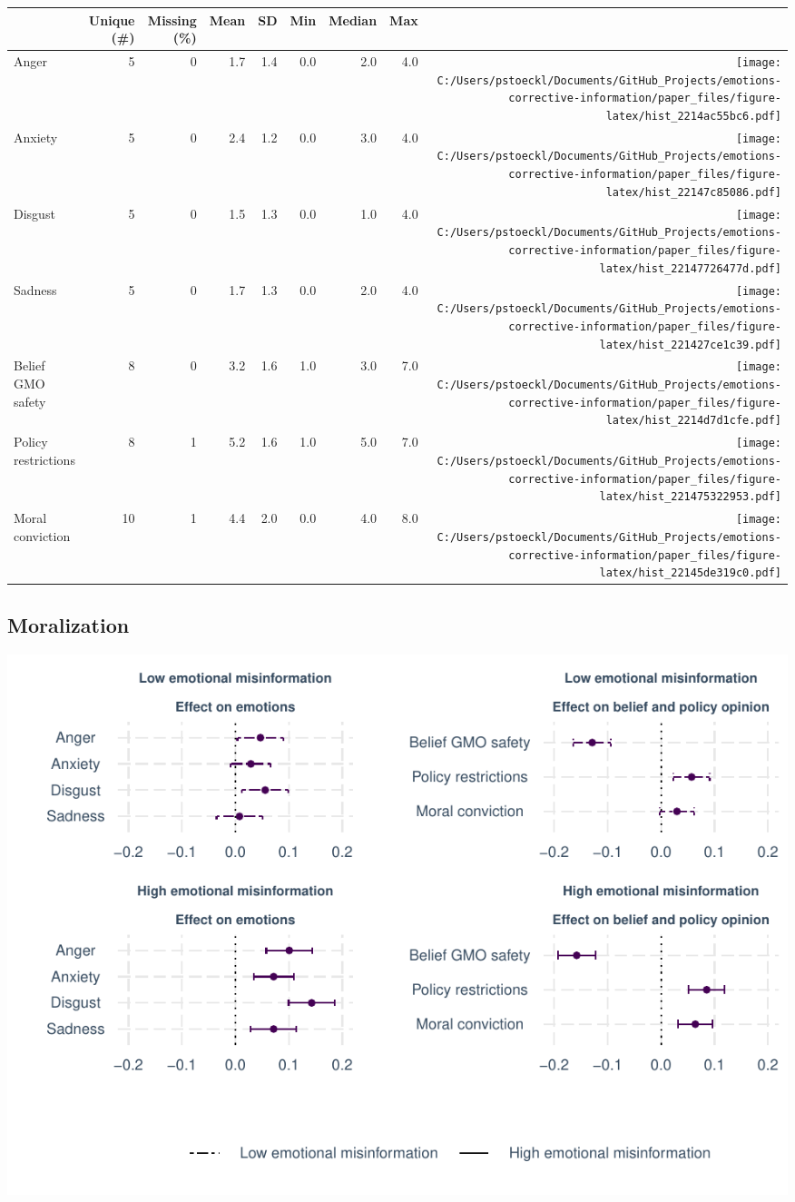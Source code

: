 \documentclass[
  12pt,
]{article}
\begin{document}
\begin{table}
\centering
\begin{tabular}[t]{lrrrrrrr>{}r}
\toprule
  & Unique (\#) & Missing (\%) & Mean & SD & Min & Median & Max &   \\
\midrule
Anger & 5 & 0 & 1.7 & 1.4 & 0.0 & 2.0 & 4.0 & \texttt{[image: C:/Users/pstoeckl/Documents/GitHub\_Projects/emotions-corrective-information/paper\_files/figure-latex/hist\_2214ac55bc6.pdf]}\\
Anxiety & 5 & 0 & 2.4 & 1.2 & 0.0 & 3.0 & 4.0 & \texttt{[image: C:/Users/pstoeckl/Documents/GitHub\_Projects/emotions-corrective-information/paper\_files/figure-latex/hist\_22147c85086.pdf]}\\
Disgust & 5 & 0 & 1.5 & 1.3 & 0.0 & 1.0 & 4.0 & \texttt{[image: C:/Users/pstoeckl/Documents/GitHub\_Projects/emotions-corrective-information/paper\_files/figure-latex/hist\_22147726477d.pdf]}\\
Sadness & 5 & 0 & 1.7 & 1.3 & 0.0 & 2.0 & 4.0 & \texttt{[image: C:/Users/pstoeckl/Documents/GitHub\_Projects/emotions-corrective-information/paper\_files/figure-latex/hist\_221427ce1c39.pdf]}\\
Belief GMO safety & 8 & 0 & 3.2 & 1.6 & 1.0 & 3.0 & 7.0 & \texttt{[image: C:/Users/pstoeckl/Documents/GitHub\_Projects/emotions-corrective-information/paper\_files/figure-latex/hist\_2214d7d1cfe.pdf]}\\
Policy restrictions & 8 & 1 & 5.2 & 1.6 & 1.0 & 5.0 & 7.0 & \texttt{[image: C:/Users/pstoeckl/Documents/GitHub\_Projects/emotions-corrective-information/paper\_files/figure-latex/hist\_221475322953.pdf]}\\
Moral conviction & 10 & 1 & 4.4 & 2.0 & 0.0 & 4.0 & 8.0 & \texttt{[image: C:/Users/pstoeckl/Documents/GitHub\_Projects/emotions-corrective-information/paper\_files/figure-latex/hist\_22145de319c0.pdf]}\\
\bottomrule
\end{tabular}
\end{table}

\hypertarget{moralization}{%
\subsection{Moralization}\label{moralization}}

\includegraphics{paper_files/figure-latex/unnamed-chunk-5-1.pdf}
\end{document}
